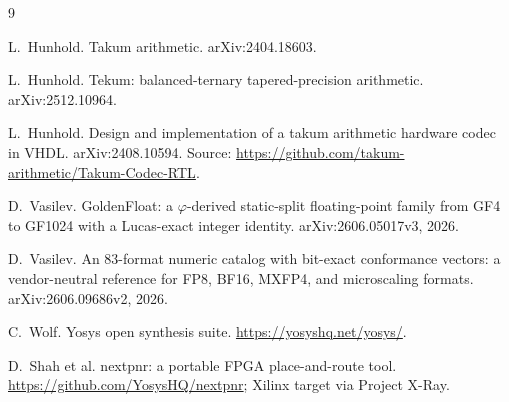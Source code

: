 \documentclass[11pt]{article}
\begin{document}
\begin{thebibliography}{9}

L.~Hunhold.
\newblock Takum arithmetic.
\newblock arXiv:2404.18603.

L.~Hunhold.
\newblock Tekum: balanced-ternary tapered-precision arithmetic.
\newblock arXiv:2512.10964.

L.~Hunhold.
\newblock Design and implementation of a takum arithmetic hardware codec in VHDL.
\newblock arXiv:2408.10594. Source: \url{https://github.com/takum-arithmetic/Takum-Codec-RTL}.

D.~Vasilev.
\newblock GoldenFloat: a $\varphi$-derived static-split floating-point family
from GF4 to GF1024 with a Lucas-exact integer identity.
\newblock arXiv:2606.05017v3, 2026.

D.~Vasilev.
\newblock An 83-format numeric catalog with bit-exact conformance vectors: a
vendor-neutral reference for FP8, BF16, MXFP4, and microscaling formats.
\newblock arXiv:2606.09686v2, 2026.

C.~Wolf.
\newblock Yosys open synthesis suite.
\newblock \url{https://yosyshq.net/yosys/}.

D.~Shah et al.
\newblock nextpnr: a portable FPGA place-and-route tool.
\newblock \url{https://github.com/YosysHQ/nextpnr}; Xilinx target via Project X-Ray.

\end{thebibliography}
\end{document}
